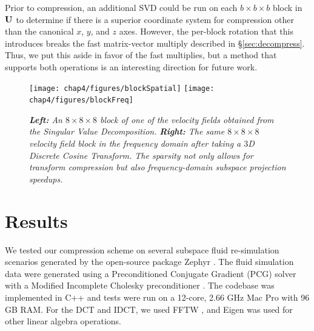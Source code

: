 Prior to compression, an additional SVD could be run on each $b \times b \times b$ block in $\mathbf{U}$ to determine if there is a superior coordinate system for compression other than the canonical $x$, $y$, and $z$ axes. However, the per-block rotation that this introduces breaks the fast matrix-vector multiply described in \S\ref{sec:decompress}. Thus, we put this aside in favor of the fast multiplies, but a method that supports both operations is an interesting direction for future work.

\begin{figure}
		\centering
		\texttt{[image: chap4/figures/blockSpatial]}
		\texttt{[image: chap4/figures/blockFreq]}
		\caption{{\em{\bf Left:} An $8 \times 8 \times 8$ block of one of the velocity fields obtained from the Singular Value Decomposition.} {\em{\bf Right:} The same $8 \times 8 \times 8$ velocity field block in the frequency domain after taking a $3$D Discrete Cosine Transform. The sparsity not only allows for transform compression but also frequency-domain subspace projection speedups.}}
		\label{fig:sparseFreq}
\end{figure}

\section{Results}
\label{sec:Results}

We tested our compression scheme on several subspace fluid re-simulation scenarios generated by the open-source package Zephyr \cite{Kim2013}. The fluid simulation data were generated using a Preconditioned Conjugate Gradient (PCG) solver with a Modified Incomplete Cholesky preconditioner \cite{Bridson:2015}. The codebase was implemented in C++ and tests were run on a 12-core, 2.66 GHz Mac Pro with 96 GB RAM. For the DCT and IDCT, we used FFTW \cite{FFTW05}, and Eigen \cite{eigenweb} was used for other linear algebra operations.

